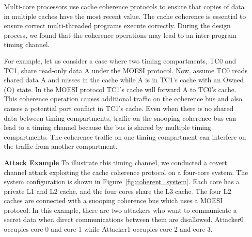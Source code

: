 Multi-core processors use cache coherence protocols to ensure that
copies of data in multiple caches have the most recent value.
The cache coherence is essential to ensure correct
multi-threaded programs execute correctly.
During the design process, we found that the coherence operations may lead
to an inter-program timing channel.


For example, let us consider a case where two timing compartments, TC0 and TC1, 
share read-only data A under the MOESI protocol.
Now, assume TC0 
reads shared data A and misses in the cache while A is in TC1's cache with 
an Owned (O) state. In the MOESI protocol
TC1's cache will forward A to TC0's cache.
This coherence operation causes additional traffic on the coherence bus and also
causes a potential port conflict in TC1's cache.
Even when there is no shared data between 
timing compartments, traffic on the snooping coherence bus can lead to
a timing channel because the bus is shared by multiple timing compartments.
The coherence traffic on one timing compartment can 
interfere on the traffic from another compartment.

{\bf Attack Example}
To illustrate this timing channel,
we conducted a covert channel attack exploiting the cache coherence 
protocol on a four-core system.  The system configuration is shown in 
Figure~\ref{fig:coherent_system}. Each core has a private L1 and L2 cache, and 
the four cores share
the L3 cache. The four L2 caches are connected with a snooping coherence bus which uses a 
MOESI protocol.  In this example, there are two attackers who
want to communicate a secret data when direct communications between them are 
disallowed. 
Attacker0 occupies core 0 and core 1 while Attacker1 occupies core 2 and
core 3. 

